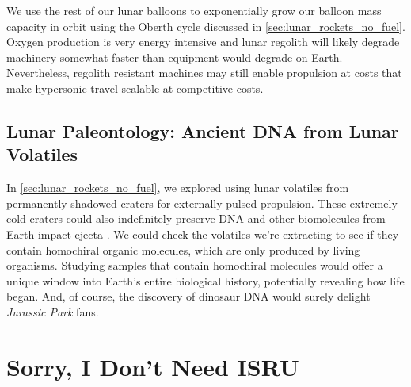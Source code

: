 \documentclass{article}
\begin{document}
{We use the rest of our lunar balloons to exponentially grow our balloon mass capacity in orbit using the Oberth cycle discussed in \autoref{sec:lunar_rockets_no_fuel}.  Oxygen production is very energy intensive and lunar regolith will likely degrade machinery somewhat faster than equipment would degrade on Earth.  Nevertheless, regolith resistant machines  may still enable propulsion at costs that make hypersonic travel scalable at competitive costs.

\subsection{Lunar Paleontology: Ancient DNA from Lunar Volatiles}\label{sec:jurassic_dark}
In \autoref{sec:lunar_rockets_no_fuel}, we explored using lunar volatiles from permanently shadowed craters for externally pulsed propulsion. These extremely cold craters could also indefinitely preserve DNA and other biomolecules from Earth impact ejecta \cite{dino_dna}. We could check the volatiles we're extracting to see if they contain homochiral organic molecules, which are only produced by living organisms.   Studying samples that contain homochiral molecules would offer a unique window into Earth's entire biological history, potentially revealing how life began. And, of course, the discovery of dinosaur DNA would surely delight \textit{Jurassic Park} \cite{jurassic_park} fans.

\section{Sorry, I Don't Need ISRU}
}
\end{document}
